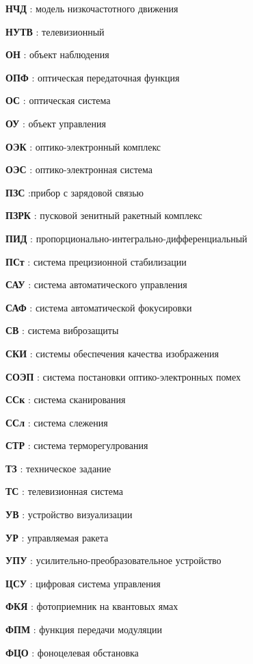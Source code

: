 \textbf{НЧД} : модель низкочастотного движения

\textbf{НУТВ} : телевизионный

\textbf{ОН} : объект наблюдения

\textbf{ОПФ} : оптическая передаточная функция

\textbf{ОС} : оптическая система

\textbf{ОУ} : объект управления

\textbf{ОЭК} : оптико-электронный комплекс

\textbf{ОЭС} : оптико-электронная система

\textbf{ПЗС} :прибор с зарядовой связью

\textbf{ПЗРК} : пусковой зенитный ракетный комплекс

\textbf{ПИД} : пропорционально-интегрально-дифференциальный

\textbf{ПСт} : система прецизионной стабилизации

\textbf{САУ} : система автоматического управления

\textbf{САФ} : система автоматической фокусировки

\textbf{СВ} : система виброзащиты

\textbf{СКИ} : системы обеспечения качества изображения

\textbf{СОЭП} : система постановки оптико-электронных помех

\textbf{ССк} : система сканирования

\textbf{ССл} : система слежения

\textbf{СТР} : система терморегулрования

\textbf{ТЗ} : техническое задание

\textbf{ТС} : телевизионная система

\textbf{УВ} : устройство визуализации

\textbf{УР} : управляемая ракета

\textbf{УПУ} : усилительно-преобразовательное устройство

\textbf{ЦСУ} : цифровая система управления

\textbf{ФКЯ} : фотоприемник на квантовых ямах

\textbf{ФПМ} : функция передачи модуляции

\textbf{ФЦО} : фоноцелевая обстановка

